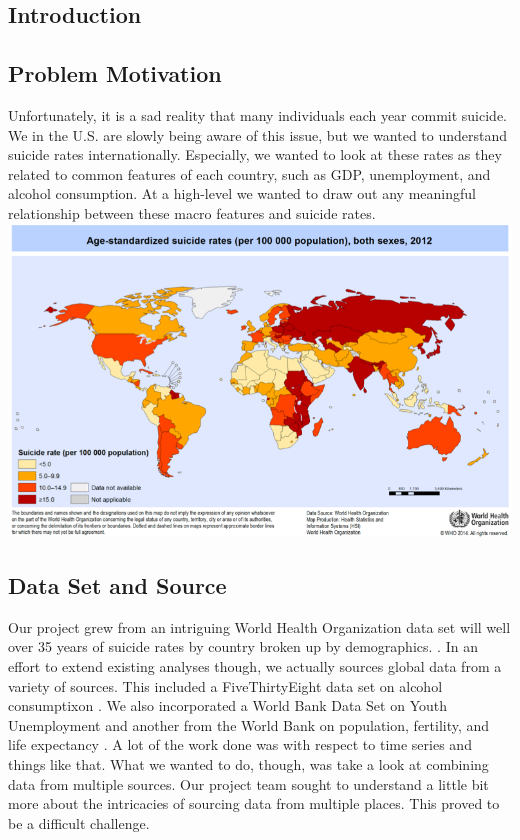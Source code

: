 \documentclass{article}
\begin{document}
\begin{multicols}{2}
\section{Introduction}
\subsection{Problem Motivation} Unfortunately, it is a sad reality that many individuals each year commit suicide. We in the U.S. are slowly being aware of this issue, but we wanted to understand suicide rates internationally. Especially, we wanted to look at these rates as they related to common features of each country, such as GDP, unemployment, and alcohol consumption. At a high-level we wanted to draw out any meaningful relationship between these macro features and suicide rates.
\includegraphics[width=\columnwidth]{2012-data-vis-map.png}
\subsection{Data Set and Source} Our project grew from an intriguing 
World Health Organization data set will well over 35 years of suicide rates by country broken up by demographics.  . In an effort to extend existing analyses though, we actually sources global data from a variety of sources. This included a FiveThirtyEight data set on alcohol consumptixon . We also incorporated a World Bank Data Set on Youth Unemployment  and another from the World Bank on population, fertility, and life expectancy . A lot of the work done was with respect to time series and things like that. What we wanted to do, though, was take a look at combining data from multiple sources. 
Our project team sought to understand a little bit more about the intricacies of sourcing data from multiple places. This proved to be a difficult challenge.  

\end{multicols}
\end{document}
